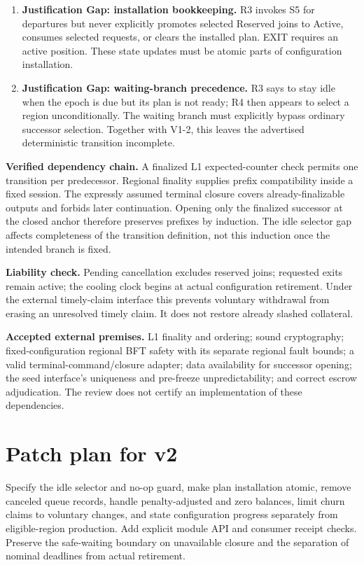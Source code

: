 \documentclass[11pt,a4paper]{article}
\begin{document}
\begin{enumerate}[label=\textbf{V1-\arabic*.},leftmargin=*,itemsep=9pt]
\item \textbf{Justification Gap: installation bookkeeping.}
R3 invokes S5 for departures but never explicitly promotes selected
\textsf{Reserved} joins to \textsf{Active}, consumes selected requests, or
clears the installed plan. EXIT requires an active position. These state
updates must be atomic parts of configuration installation.

\item \textbf{Justification Gap: waiting-branch precedence.}
R3 says to stay idle when the epoch is due but its plan is not ready;
R4 then appears to select a region unconditionally. The waiting branch
must explicitly bypass ordinary successor selection. Together with
V1-2, this leaves the advertised deterministic transition incomplete.
\end{enumerate}

\textbf{Verified dependency chain.} A finalized L1 expected-counter check
permits one transition per predecessor. Regional finality supplies prefix
compatibility inside a fixed session. The expressly assumed terminal
closure covers already-finalizable outputs and forbids later continuation.
Opening only the finalized successor at the closed anchor therefore
preserves prefixes by induction. The idle selector gap affects completeness
of the transition definition, not this induction once the intended branch
is fixed.

\textbf{Liability check.} Pending cancellation excludes reserved joins;
requested exits remain active; the cooling clock begins at actual
configuration retirement. Under the external timely-claim interface this
prevents voluntary withdrawal from erasing an unresolved timely claim.
It does not restore already slashed collateral.

\textbf{Accepted external premises.} L1 finality and ordering; sound
cryptography; fixed-configuration regional BFT safety with its separate
regional fault bounds; a valid terminal-command/closure adapter; data
availability for successor opening; the seed interface's uniqueness and
pre-freeze unpredictability; and correct escrow adjudication. The review
does not certify an implementation of these dependencies.

\section*{Patch plan for v2}
Specify the idle selector and no-op guard, make plan installation atomic,
remove canceled queue records, handle penalty-adjusted and zero balances,
limit churn claims to voluntary changes, and state configuration progress
separately from eligible-region production. Add explicit module API and
consumer receipt checks. Preserve the safe-waiting boundary on unavailable
closure and the separation of nominal deadlines from actual retirement.
\end{document}
